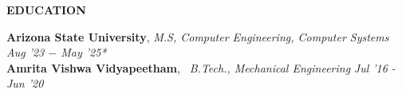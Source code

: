 \documentclass[10pt,a4]{article}
\def\hrulefill{\leavevmode\leaders\hrule height 1pt\hfill\kern0pt}		%
\begin{document}
{\begin{flushleft}
\end{flushleft}

\vspace{0.25mm}
\begin{flushleft}
	{\Large \textbf{EDUCATION}} %
    
    	\hspace{1.5mm} \textbf{\large Arizona State University}, \textit{M.S, Computer Engineering, Computer Systems}  \hfill \textit{Aug '23 $-$ May '25*}	\\
        
        \hspace{1.5mm} \textbf{\large Amrita Vishwa Vidyapeetham}, \textit{\ B.Tech., Mechanical Engineering} \hfill \textit{ Jul '16 - Jun '20}	\\

\end{flushleft}
}
	
\end{document}
